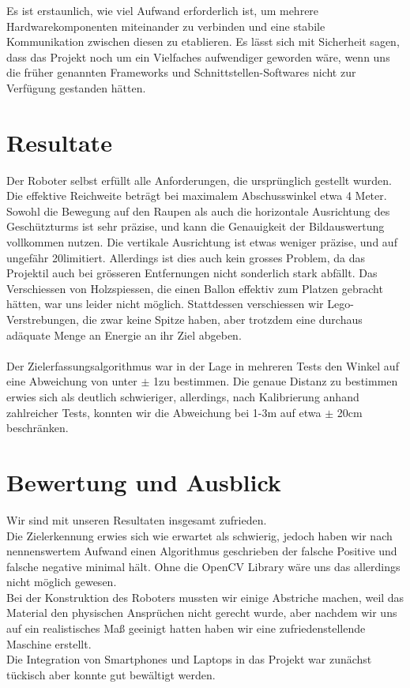 \documentclass[12pt,a4paper]{article}
\begin{document}
Es ist erstaunlich, wie viel Aufwand erforderlich ist, um mehrere Hardwarekomponenten miteinander zu verbinden und eine stabile Kommunikation zwischen diesen zu etablieren. Es lässt sich mit Sicherheit sagen, dass das Projekt noch um ein Vielfaches aufwendiger geworden wäre, wenn uns die früher genannten Frameworks und Schnittstellen-Softwares nicht zur Verfügung gestanden hätten.

\section{Resultate}
Der Roboter selbst erfüllt alle Anforderungen, die ursprünglich gestellt wurden. Die effektive Reichweite beträgt bei maximalem Abschusswinkel etwa 4 Meter. 
Sowohl die Bewegung auf den Raupen als auch die horizontale Ausrichtung des Geschützturms ist sehr präzise, und kann die Genauigkeit der Bildauswertung 
vollkommen nutzen. Die vertikale Ausrichtung ist etwas weniger präzise, und auf ungefähr 20\degree limitiert. Allerdings ist dies auch kein grosses Problem, da 
das Projektil auch bei grösseren Entfernungen nicht sonderlich stark abfällt. Das Verschiessen von Holzspiessen, die einen Ballon effektiv zum Platzen gebracht
hätten, war uns leider nicht möglich. Stattdessen verschiessen wir Lego-Verstrebungen, die zwar keine Spitze haben, aber trotzdem eine durchaus adäquate Menge
an Energie an ihr Ziel abgeben.\hfill\\
\hfill\\
Der Zielerfassungsalgorithmus war in der Lage in mehreren Tests den Winkel auf eine Abweichung von unter $\pm$ 1\degree zu bestimmen.
Die genaue Distanz zu bestimmen erwies sich als deutlich schwieriger, allerdings, nach Kalibrierung anhand zahlreicher Tests, konnten wir die Abweichung bei 1-3m auf etwa $\pm$ 20cm beschränken.

\section{Bewertung und Ausblick}
Wir sind mit unseren Resultaten insgesamt zufrieden.\hfill\\
Die Zielerkennung erwies sich wie erwartet als schwierig, jedoch haben wir nach nennenswertem Aufwand einen Algorithmus geschrieben der falsche Positive und falsche negative minimal hält. Ohne die OpenCV Library wäre uns das allerdings nicht möglich gewesen.\hfill\\
Bei der Konstruktion des Roboters mussten wir einige Abstriche machen, weil das Material den physischen Ansprüchen nicht gerecht wurde, aber nachdem wir uns auf ein realistisches Maß geeinigt hatten haben wir eine zufriedenstellende Maschine erstellt.\hfill\\
Die Integration von Smartphones und Laptops in das Projekt war zunächst tückisch aber konnte gut bewältigt werden.
\end{document}
